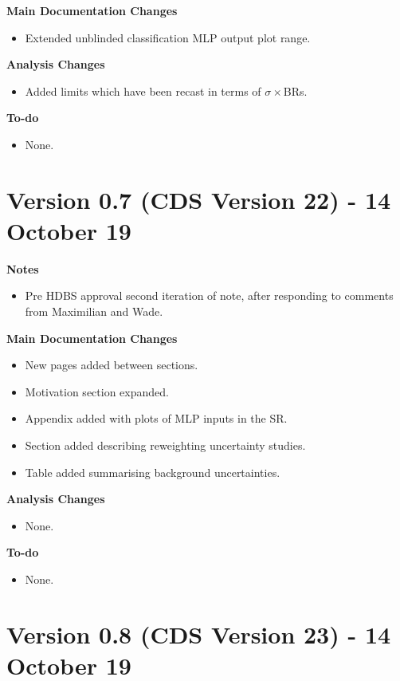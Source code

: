 \documentclass[NOTE, atlasdraft=true, texlive=2017, UKenglish]{\ATLASLATEXPATH atlasdoc}
\begin{document}
\textbf{Main Documentation Changes}
\begin{itemize}
\item Extended unblinded classification MLP output plot range.
\end{itemize}

\textbf{Analysis Changes}
\begin{itemize}
\item Added limits which have been recast in terms of $\sigma\times$BRs.
\end{itemize}

\textbf{To-do}
\begin{itemize}
\item None.
\end{itemize}


\section*{Version 0.7 (CDS Version 22) - 14 October 19}

\textbf{Notes}
\begin{itemize}
\item Pre HDBS approval second iteration of note, after responding to comments from Maximilian and Wade.
\end{itemize}

\textbf{Main Documentation Changes}
\begin{itemize}
\item New pages added between sections.
\item Motivation section expanded.
\item Appendix added with plots of MLP inputs in the SR.
\item Section added describing reweighting uncertainty studies.
\item Table added summarising background uncertainties.
\end{itemize}

\textbf{Analysis Changes}
\begin{itemize}
\item None.
\end{itemize}

\textbf{To-do}
\begin{itemize}
\item None.
\end{itemize}


\section*{Version 0.8 (CDS Version 23) - 14 October 19}
\end{document}

